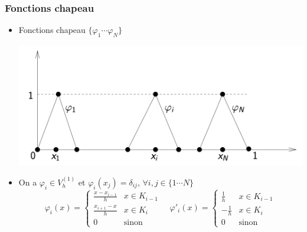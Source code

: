 \documentclass{beamer}
\begin{document}
\begin{frame}
\frametitle{Fonctions chapeau}


\begin{itemize}
\item Fonctions chapeau $\{\varphi_1 \cdots \varphi_N \}$
\begin{center}
\includegraphics[scale=0.18]{varphiD1.png} 
\end{center}

\item On a $\varphi_i\in V_h^{(1)}$ et $\varphi_i(x_j)=\delta_{ij}$, $\forall i,j\in \{1 \cdots N \}$
\[\varphi_i(x)=\left\{\begin{array}{ll}
\frac{x-x_{i-1}}{h}& x\in K_{i-1}\\
\frac{x_{i+1}-x}{h}& x\in K_{i}\\
0&\mbox{sinon}
\end{array}\right. \quad \varphi'_i(x)=\left\{\begin{array}{ll}
\frac{1}{h}& x\in K_{i-1}\\
-\frac{1}{h}& x\in K_{i}\\
0&\mbox{sinon}
\end{array}\right. \]
\end{itemize}

\end{frame}
\end{document}
